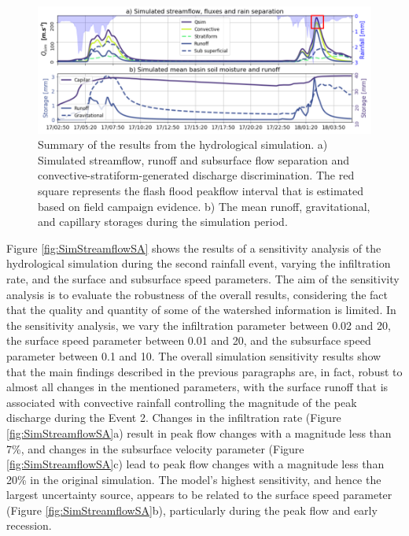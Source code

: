 \documentclass[hess, manuscript]{copernicus}
\begin{document}
\begin{figure}[t]
\centering
 \includegraphics[width=12cm]{Figures/Caudal_Sim_v2.png}
 \caption{Summary of the results from the hydrological simulation. a) Simulated streamflow, runoff and subsurface flow separation and convective-stratiform-generated discharge discrimination. The red square represents the flash flood peakflow interval that is estimated based on field campaign evidence. b) The mean runoff, gravitational, and capillary storages during the simulation period.}
    \label{fig:SimStreamflow}
\end{figure}

Figure \ref{fig:SimStreamflowSA} shows the results of a sensitivity analysis of the hydrological simulation during the second rainfall event, varying the infiltration rate, and the surface and subsurface speed parameters. The aim of the sensitivity analysis is to evaluate the robustness of the overall results, considering the fact that the quality and quantity of some of the watershed information is limited. In the sensitivity analysis, we vary the infiltration parameter between 0.02 and 20, the surface speed parameter between 0.01 and 20, and the subsurface speed parameter between 0.1 and 10. The overall simulation sensitivity results show that the main findings described in the previous paragraphs are, in fact, robust to almost all changes in the mentioned parameters, with the surface runoff that is associated with convective rainfall controlling the magnitude of the peak discharge during the Event 2. Changes in the infiltration rate (Figure \ref{fig:SimStreamflowSA}a) result in peak flow changes with a magnitude less than 7\%,  and changes in the subsurface velocity parameter (Figure \ref{fig:SimStreamflowSA}c) lead to peak flow changes with a magnitude less than 20\% in the original simulation. The model's highest sensitivity, and hence the largest uncertainty source, appears to be related to the surface speed parameter (Figure \ref{fig:SimStreamflowSA}b), particularly during the peak flow and early recession. \\
\end{document}
